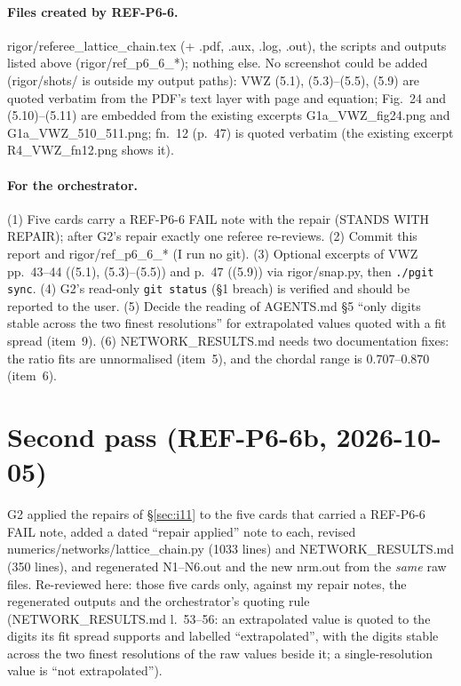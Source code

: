 \documentclass[11pt]{article}
\begin{document}
\paragraph{Files created by REF-P6-6.} rigor/referee\_lattice\_chain.tex (+ .pdf, .aux, .log, .out), the scripts and
outputs listed above (rigor/ref\_p6\_6\_*); nothing else. No screenshot could be added (rigor/shots/ is outside my
output paths): VWZ (5.1), (5.3)--(5.5), (5.9) are quoted verbatim from the PDF's text layer with page and equation;
Fig.~24 and (5.10)--(5.11) are embedded from the existing excerpts G1a\_VWZ\_fig24.png and
G1a\_VWZ\_510\_511.png; fn.~12 (p.~47) is quoted verbatim (the existing excerpt R4\_VWZ\_fn12.png shows it).

\paragraph{For the orchestrator.} (1) Five cards carry a REF-P6-6 FAIL note with the repair (STANDS WITH REPAIR);
after G2's repair exactly one referee re-reviews. (2) Commit this report and rigor/ref\_p6\_6\_* (I run no git).
(3) Optional excerpts of VWZ pp.~43--44 ((5.1), (5.3)--(5.5)) and p.~47 ((5.9)) via rigor/snap.py, then
\texttt{./pgit sync}. (4) G2's read-only \texttt{git status} (\S1 breach) is verified and should be reported to the
user. (5) Decide the reading of AGENTS.md \S5 ``only digits stable across the two finest resolutions'' for
extrapolated values quoted with a fit spread (item~9). (6) NETWORK\_RESULTS.md needs two documentation fixes: the
ratio fits are unnormalised (item~5), and the chordal range is 0.707--0.870 (item~6).

\section{Second pass (REF-P6-6b, 2026-10-05)}\label{sec:second}
G2 applied the repairs of \S\ref{sec:i11} to the five cards that carried a REF-P6-6 FAIL note, added a dated
``repair applied'' note to each, revised numerics/networks/lattice\_chain.py (1033 lines) and NETWORK\_RESULTS.md
(350 lines), and regenerated N1--N6.out and the new nrm.out from the \emph{same} raw files. Re-reviewed here: those
five cards only, against my repair notes, the regenerated outputs and the orchestrator's quoting rule
(NETWORK\_RESULTS.md l.~53--56: an extrapolated value is quoted to the digits its fit spread supports and labelled
``extrapolated'', with the digits stable across the two finest resolutions of the raw values beside it; a
single-resolution value is ``not extrapolated'').
\end{document}
